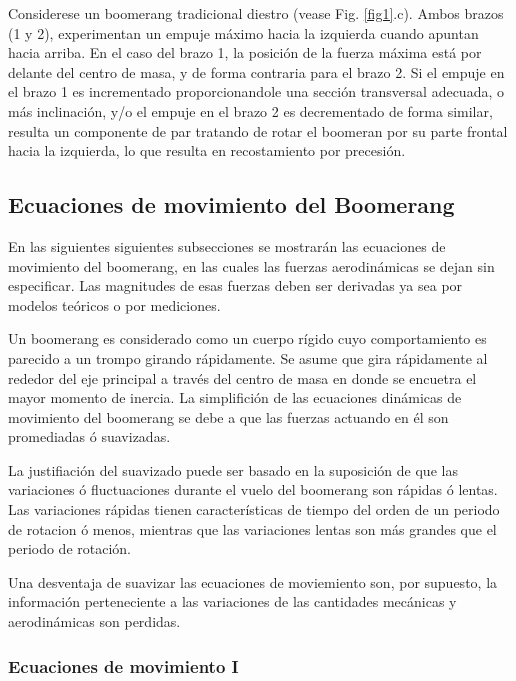 	Considerese un boomerang tradicional diestro (vease Fig. \ref{fig1}.c). Ambos brazos (1 y 2), experimentan un empuje máximo hacia la izquierda cuando apuntan hacia arriba. En el caso del brazo 1, la posición de la fuerza máxima está por delante del centro de masa, y de forma contraria para el brazo 2. Si el empuje en el brazo 1 es incrementado proporcionandole una sección transversal adecuada, o más inclinación, y/o el empuje en el brazo 2 es decrementado de forma similar, resulta un componente de par tratando de rotar el boomeran por su parte frontal hacia la izquierda, lo que resulta en recostamiento por precesión.


	\subsection{Ecuaciones de movimiento del Boomerang}

	 En las siguientes siguientes subsecciones se mostrarán las ecuaciones de movimiento del boomerang, en las cuales las fuerzas aerodinámicas se dejan sin especificar. Las magnitudes de esas fuerzas deben ser derivadas ya sea por modelos teóricos o por mediciones.

	 Un boomerang es considerado como un cuerpo rígido cuyo comportamiento es parecido a un trompo girando rápidamente. Se asume que gira rápidamente  al rededor del eje principal a través del centro de masa en donde se encuetra el mayor momento de inercia. La simplifición de las ecuaciones dinámicas de movimiento del boomerang se debe a que las fuerzas actuando en él son promediadas ó suavizadas.

	 La justifiación del suavizado puede ser basado en la suposición de que las variaciones ó fluctuaciones durante el vuelo del boomerang son rápidas ó lentas. Las variaciones rápidas tienen características de tiempo del orden de un periodo de rotacion ó menos, mientras que las variaciones lentas son más grandes que el periodo de rotación.

	 Una desventaja de suavizar las ecuaciones de moviemiento son, por supuesto, la información perteneciente a las variaciones de las cantidades mecánicas y aerodinámicas son perdidas.


	\subsubsection{Ecuaciones de movimiento I}

